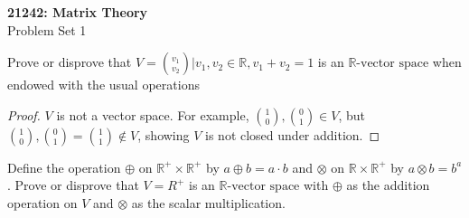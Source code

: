 \documentclass[11pt]{article}
\newcommand{\course}{21242: Matrix Theory} %
\newcommand{\psetnum}{1}
\newcommand{\maketop}{
    \begin{center}
    {\LARGE\bfseries \course}\\[3pt]
    {\large Problem Set \psetnum}
  \end{center}\vspace{1.5em}
}
\newcommand{\R}{\mathbb{R}}
\begin{document}
\maketop
\begin{problem}[Problem 1A]
Prove or disprove that $V = {\binom{v_1}{v_2} | v_1, v_2 \in \R, v_1+v_2 = 1}$ is an $\R\text{-vector space}$ when endowed with the usual operations
\end{problem}
\begin{proof}
$V$ is not a vector space. For example, $\binom{1}{0}, \binom{0}{1} \in V$, but $\binom{1}{0}, \binom{0}{1} = \binom{1}{1} \notin V$, showing $V$ is not closed under addition.
\end{proof}

\begin{problem}[Problem 1B]
Define the operation $\oplus$ on $\R^+ \times \R^+$ by $a\oplus b = a\cdot b$ and $\otimes$ on $\R\times\R^+$ by $a\otimes b = b^a$. Prove or disprove that $V=R^+$ is an $\R\text{-vector space}$ with $\oplus$ as the addition operation on $V$ and $\otimes$ as the scalar multiplication.
\end{problem}
\end{document}
